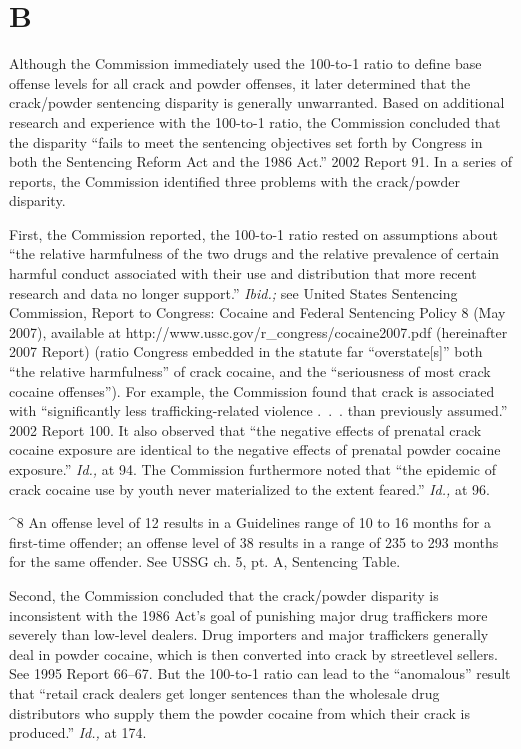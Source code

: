 {\section{B}

  Although the Commission immediately used the 100-to-1 ratio to
define base offense levels for all crack and powder offenses, it later
determined that the crack/powder sentencing disparity is generally
unwarranted. Based on additional research and experience with the
100-to-1 ratio, the Commission concluded that the disparity ``fails
to meet the sentencing objectives set forth by Congress in both the
Sentencing Reform Act and the 1986 Act.'' 2002 Report 91. In a
series of reports, the Commission identified three problems with the
crack/powder disparity.

  First, the Commission reported, the 100-to-1 ratio rested on
assumptions about ``the relative harmfulness of the two drugs and the
relative prevalence of certain harmful conduct associated with their
use and distribution that more recent research and data no longer
support.'' \emph{Ibid.;} see United States Sentencing Commission,
Report to Congress: Cocaine and Federal Sentencing Policy 8 (May
2007), available at http://www.ussc.gov/r_congress/cocaine2007.pdf
(hereinafter 2007 Report) (ratio Congress embedded in the statute
far ``overstate[s]'' both ``the relative harmfulness'' of
crack co\newpage caine, and the ``seriousness of most crack cocaine
offenses''). For example, the Commission found that crack is
associated with ``significantly less trafficking-related violence
.~.~. than previously assumed.'' 2002 Report 100. It also observed
that ``the negative effects of prenatal crack cocaine exposure
are identical to the negative effects of prenatal powder cocaine
exposure.'' \emph{Id.,} at 94. The Commission furthermore noted that
``the epidemic of crack cocaine use by youth never materialized to the
extent feared.'' \emph{Id.,} at 96.

^8 An offense level of 12 results in a Guidelines range of 10 to 16
months for a first-time offender; an offense level of 38 results in a
range of 235 to 293 months for the same offender. See USSG ch. 5, pt.
A, Sentencing Table.

  Second, the Commission concluded that the crack/powder disparity
is inconsistent with the 1986 Act's goal of punishing major drug
traffickers more severely than low-level dealers. Drug importers
and major traffickers generally deal in powder cocaine, which is
then converted into crack by streetlevel sellers. See 1995 Report
66--67. But the 100-to-1 ratio can lead to the ``anomalous'' result
that ``retail crack dealers get longer sentences than the wholesale
drug distributors who supply them the powder cocaine from which their
crack is produced.'' \emph{Id.,} at 174.

}
